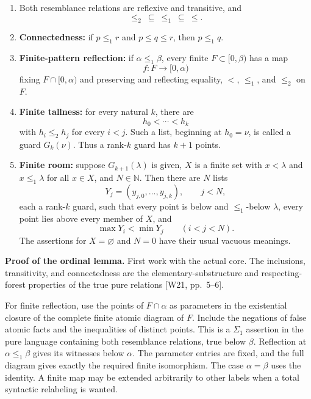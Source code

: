 \documentclass[
  11pt,
  letterpaper,
]{article}
\begin{document}
\begin{enumerate}
\def\labelenumi{\arabic{enumi}.}
\item
  Both resemblance relations are reflexive and transitive, and \[
  \leq_2\ \subseteq\ \leq_1\ \subseteq\ \leq.
  \]
\item
  \textbf{Connectedness:} if \(p\leq_1r\) and \(p\leq q\leq r\), then
  \(p\leq_1q\).
\item
  \textbf{Finite-pattern reflection:} if \(\alpha\leq_1\beta\), every
  finite \(F\subset[0,\beta)\) has a map \[
  f:F\longrightarrow[0,\alpha)
  \] fixing \(F\cap[0,\alpha)\) and preserving and reflecting equality,
  \(<\), \(\leq_1\), and \(\leq_2\) on \(F\).
\item
  \textbf{Finite tallness:} for every natural \(k\), there are \[
  h_0<\cdots<h_k
  \] with \(h_i\leq_2h_j\) for every \(i<j\). Such a list, beginning at
  \(h_0=\nu\), is called a guard \(G_k(\nu)\). Thus a rank-\(k\) guard
  has \(k+1\) points.
\item
  \textbf{Finite room:} suppose \(G_{k+1}(\lambda)\) is given, \(X\) is
  a finite set with \(x<\lambda\) and \(x\leq_1\lambda\) for all
  \(x\in X\), and \(N\in\mathbb N\). Then there are \(N\) lists \[
  Y_j=(y_{j,0},\ldots,y_{j,k}),\qquad j<N,
  \] each a rank-\(k\) guard, such that every point is below and
  \(\leq_1\)-below \(\lambda\), every point lies above every member of
  \(X\), and \[
  \max Y_i<\min Y_j\qquad(i<j<N).
  \tag{O1}
  \] The assertions for \(X=\varnothing\) and \(N=0\) have their usual
  vacuous meanings.
\end{enumerate}

\textbf{Proof of the ordinal lemma.} First work with the actual core.
The inclusions, transitivity, and connectedness are the
elementary-substructure and respecting-forest properties of the true
pure relations {[}W21, pp.~5--6{]}.

For finite reflection, use the points of \(F\cap\alpha\) as parameters
in the existential closure of the complete finite atomic diagram of
\(F\). Include the negations of false atomic facts and the inequalities
of distinct points. This is a \(\Sigma_1\) assertion in the pure
language containing both resemblance relations, true below \(\beta\).
Reflection at \(\alpha\leq_1\beta\) gives its witnesses below
\(\alpha\). The parameter entries are fixed, and the full diagram gives
exactly the required finite isomorphism. The case \(\alpha=\beta\) uses
the identity. A finite map may be extended arbitrarily to other labels
when a total syntactic relabeling is wanted.
\end{document}
